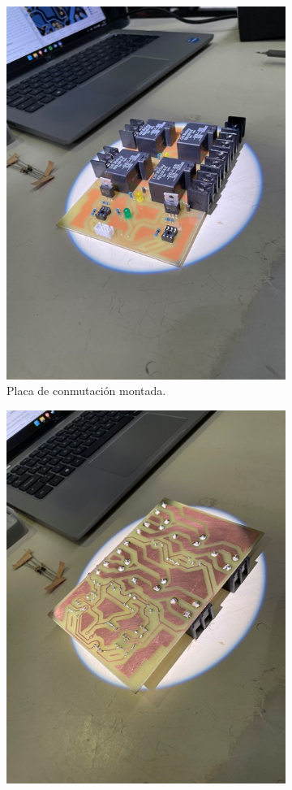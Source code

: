 \begin{figure}[H]

\begin{subfigure}{0.5\textwidth}
\includegraphics[width=0.9\linewidth]{informes/IMG_8220.jpg} 
\caption{Placa de conmutación montada.}
\end{subfigure}
\begin{subfigure}{0.5\textwidth}
\includegraphics[width=0.9\linewidth]{informes/IMG_8221.jpg}

\end{subfigure}
\end{figure}
